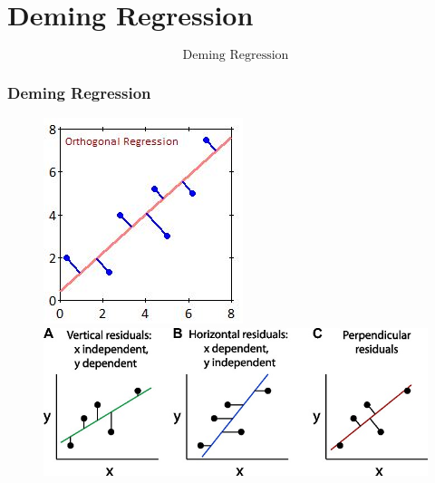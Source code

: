 \documentclass{beamer}
\begin{document}
\section{Deming Regression}
\begin{frame}
	\LARGE
	\[\mbox{Deming Regression}\]
\end{frame}
\begin{frame}
	\frametitle{Deming Regression}
	\begin{figure}
		\centering
		\includegraphics[width=0.35\linewidth]{images/OrthogonalRegression}
		
		\includegraphics[width=0.8\linewidth]{images/elife_regressions}
		
	\end{figure}
	
\end{frame}
\end{document}
